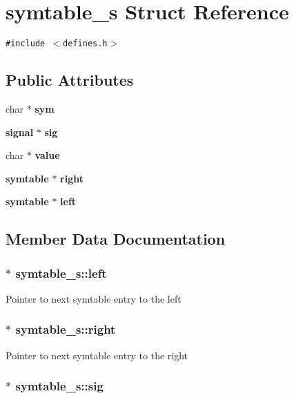 \section{symtable\_\-s  Struct Reference}
\label{structsymtable__s}
{\tt \#include $<$defines.h$>$}

\subsection*{Public Attributes}
\begin{CompactItemize}
\item 
char $\ast$ {\bf sym}
\item 
{\bf signal} $\ast$ {\bf sig}
\item 
char $\ast$ {\bf value}
\item 
{\bf symtable} $\ast$ {\bf right}
\item 
{\bf symtable} $\ast$ {\bf left}
\end{CompactItemize}


\subsection{Member Data Documentation}
\subsubsection{$\ast$ symtable\_\-s::left}\label{structsymtable__s_m4}


Pointer to next symtable entry to the left 
\subsubsection{$\ast$ symtable\_\-s::right}\label{structsymtable__s_m3}


Pointer to next symtable entry to the right 
\subsubsection{$\ast$ symtable\_\-s::sig}\label{structsymtable__s_m1}


